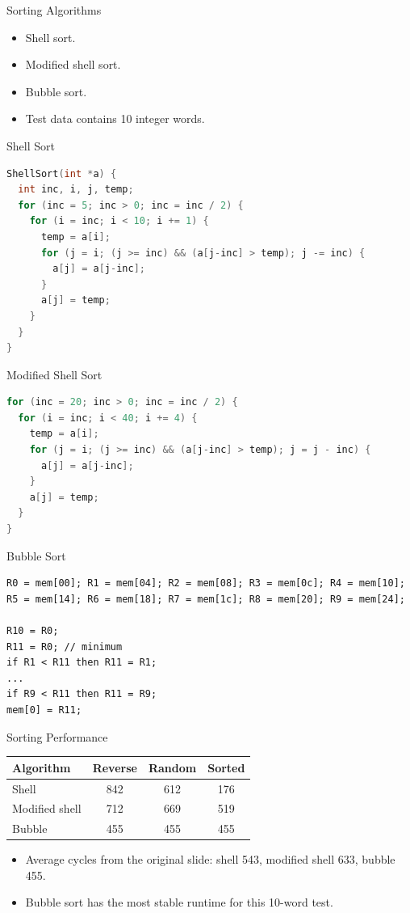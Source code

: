 \documentclass[aspectratio=169,professionalfonts]{beamer}
\begin{document}
\begin{frame}{Sorting Algorithms}
  \begin{itemize}
    \item Shell sort.
    \item Modified shell sort.
    \item Bubble sort.
    \item Test data contains 10 integer words.
  \end{itemize}
\end{frame}

\begin{frame}[fragile]{Shell Sort}
\begin{lstlisting}[language=C]
ShellSort(int *a) {
  int inc, i, j, temp;
  for (inc = 5; inc > 0; inc = inc / 2) {
    for (i = inc; i < 10; i += 1) {
      temp = a[i];
      for (j = i; (j >= inc) && (a[j-inc] > temp); j -= inc) {
        a[j] = a[j-inc];
      }
      a[j] = temp;
    }
  }
}
\end{lstlisting}
\end{frame}

\begin{frame}[fragile]{Modified Shell Sort}
\begin{lstlisting}[language=C]
for (inc = 20; inc > 0; inc = inc / 2) {
  for (i = inc; i < 40; i += 4) {
    temp = a[i];
    for (j = i; (j >= inc) && (a[j-inc] > temp); j = j - inc) {
      a[j] = a[j-inc];
    }
    a[j] = temp;
  }
}
\end{lstlisting}
\end{frame}

\begin{frame}[fragile]{Bubble Sort}
\begin{lstlisting}
R0 = mem[00]; R1 = mem[04]; R2 = mem[08]; R3 = mem[0c]; R4 = mem[10];
R5 = mem[14]; R6 = mem[18]; R7 = mem[1c]; R8 = mem[20]; R9 = mem[24];

R10 = R0;
R11 = R0; // minimum
if R1 < R11 then R11 = R1;
...
if R9 < R11 then R11 = R9;
mem[0] = R11;
\end{lstlisting}
\end{frame}

\begin{frame}{Sorting Performance}
  \begin{tabular}{lccc}
    \toprule
    Algorithm & Reverse & Random & Sorted\\
    \midrule
    Shell & 842 & 612 & 176\\
    Modified shell & 712 & 669 & 519\\
    Bubble & 455 & 455 & 455\\
    \bottomrule
  \end{tabular}
  \vspace{1em}
  \begin{itemize}
    \item Average cycles from the original slide: shell 543, modified shell 633, bubble 455.
    \item Bubble sort has the most stable runtime for this 10-word test.
  \end{itemize}
\end{frame}
\end{document}
